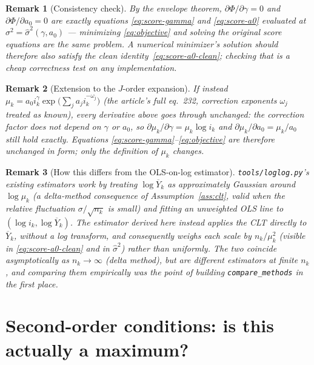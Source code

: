\documentclass[11pt]{article}
\newtheorem{remark}{Remark}
\begin{document}
\begin{remark}[Consistency check]
By the envelope theorem, $\partial \Phi/\partial\gamma = 0$ and
$\partial\Phi/\partial a_0 = 0$ are exactly equations \eqref{eq:score-gamma}
and \eqref{eq:score-a0} evaluated at $\sigma^2 = \hat\sigma^2(\gamma,a_0)$ ---
minimizing \eqref{eq:objective} and solving the original score equations are
the same problem. A numerical minimizer's solution should therefore also
satisfy the clean identity~\eqref{eq:score-a0-clean}; checking that is a
cheap correctness test on any implementation.
\end{remark}

\begin{remark}[Extension to the $J$-order expansion]
\label{rmk:corrections}
If instead $\mu_k = a_0 i_k^\gamma \exp\!\big(\sum_j a_j i_k^{-\omega_j}\big)$
(the article's full eq.~232, correction exponents $\omega_j$ treated as
known), every derivative above goes through unchanged: the correction factor
does not depend on $\gamma$ or $a_0$, so $\partial \mu_k/\partial\gamma =
\mu_k \log i_k$ and $\partial\mu_k/\partial a_0 = \mu_k/a_0$ still hold
exactly. Equations \eqref{eq:score-gamma}--\eqref{eq:objective} are therefore
unchanged in form; only the definition of $\mu_k$ changes.
\end{remark}

\begin{remark}[How this differs from the OLS-on-log estimator]
\label{rmk:vs-ols}
\texttt{tools/loglog.py}'s existing estimators work by treating
$\log\overline{Y}_k$ as approximately Gaussian around $\log\mu_k$ (a
delta-method consequence of Assumption~\ref{ass:clt}, valid when the relative
fluctuation $\sigma/\sqrt{n_k}$ is small) and fitting an \emph{unweighted}
OLS line to $(\log i_k, \log \overline{Y}_k)$. The estimator derived here
instead applies the CLT directly to $\overline{Y}_k$, without a log
transform, and consequently weighs each scale by $n_k/\mu_k^2$ (visible in
\eqref{eq:score-a0-clean} and in $\hat\sigma^2$) rather than uniformly. The
two coincide asymptotically as $n_k \to \infty$ (delta method), but are
different estimators at finite $n_k$, and comparing them empirically was the
point of building \texttt{compare\_methods} in the first place.
\end{remark}

\section{Second-order conditions: is this actually a maximum?}
\label{sec:second-order}
\end{document}
